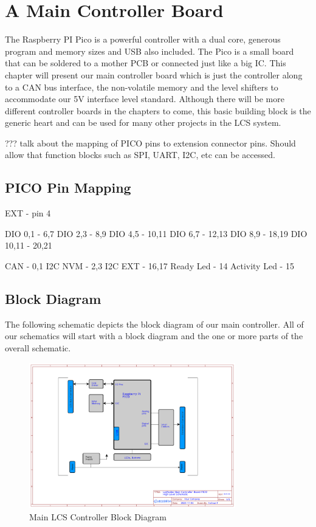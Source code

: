 \chapter{A Main Controller Board}

The Raspberry PI Pico is a powerful controller with a dual core, generous program and memory sizes and USB also included. The Pico is a small board that can be soldered to a mother PCB or connected just like a big IC. This chapter will present our main controller board which is just the controller along to a CAN bus interface, the non-volatile memory and the level shifters to accommodate our 5V interface level standard. Although there will be more different controller boards in the chapters to come, this basic building block is the generic heart and can be used for many other projects in the LCS system.


??? talk about the mapping of PICO pins to extension connector pins. Should allow that function blocks such as SPI, UART, I2C, etc can be accessed.

\section{PICO Pin Mapping}

EXT             - pin 4

DIO 0,1         - 6,7
DIO 2,3         - 8,9
DIO 4,5         - 10,11
DIO 6,7         - 12,13
DIO 8,9         - 18,19
DIO 10,11       - 20,21

CAN             - 0,1
I2C NVM         - 2,3
I2C EXT         - 16,17
Ready Led       - 14
Activity Led    - 15


\section{Block Diagram}

The following schematic depicts the block diagram of our main controller. All of our schematics will start with a block diagram and the one or more parts of the overall schematic.

\begin{figure}[htbp]
    \centering
    \includegraphics[page=1, width=0.8\textwidth]{./Schematics/Schematic_LcsNodes-Main-Controller-Board.pdf}
    \caption{Main LCS Controller Block Diagram}
\end{figure}
\FloatBarrier

